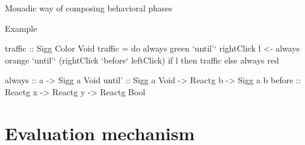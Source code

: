 \documentclass{beamer}
\begin{document}
\begin{frame}{Monadic way of composing behavioral phases}

\begin{block}{Example}
\vspace{-0.4cm}
\begin{center}
\end{center}
\vspace{-0.6cm}


\begin{code}
traffic :: Sigg Color Void
traffic = 
  do  always green `until'` rightClick
      l <- always orange `until'` (rightClick `before` leftClick)
      if l then traffic else always red
\end{code}
\begin{code}
always  :: a -> Sigg a Void
until'  :: Sigg a Void -> Reactg b -> Sigg a b
before  :: Reactg x -> Reactg y -> Reactg Bool
\end{code}
\setlength{\mathindent}{\tmathindenta}
\vspace{-0.8cm}
\end{block}
\end{frame}


\section{Evaluation mechanism}
\end{document}
